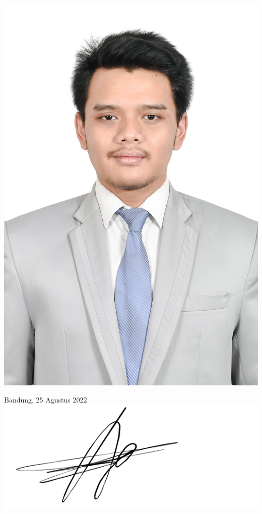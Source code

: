 \begin{minipage}{0.3\textwidth}
	\includegraphics[scale=0.4] {./assets/PASFOTO}
\end{minipage}
\begin{minipage}{0.6\textwidth}\raggedleft
	Bandung, 25 Agustus 2022\\
	\vspace{1em}
	\includegraphics[scale=0.3]{./assets/signature}\\
	\vspace{1em}
	\penulis\\
	\nim
\end{minipage}
